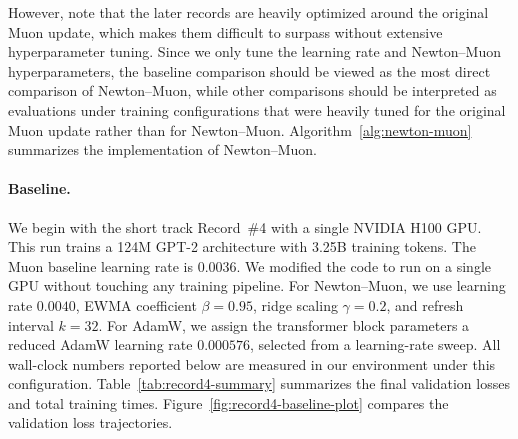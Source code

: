 \documentclass[11pt]{article}
\begin{document}
However, note that the later records are heavily optimized around the original Muon update, which makes them difficult to surpass without extensive hyperparameter tuning.
Since we only tune the learning rate and Newton--Muon hyperparameters, the baseline comparison should be viewed as the most direct comparison of Newton--Muon, while other comparisons should be interpreted as evaluations under training configurations that were heavily tuned for the original Muon update rather than for Newton--Muon.
Algorithm~\ref{alg:newton-muon} summarizes the implementation of Newton--Muon.

\begin{algorithm}[htb]
\caption{Newton--Muon}
\label{alg:newton-muon}
\DontPrintSemicolon


\BlankLine
{}
\end{algorithm}

\paragraph{Baseline.}
We begin with the short track Record~\#4 with a single NVIDIA H100 GPU. This run trains a 124M GPT-2 architecture with 3.25B training tokens. The Muon baseline
learning rate is $0.0036$. We modified the code to run on a single GPU without touching any training pipeline. For Newton--Muon, we use learning
rate $0.0040$, EWMA coefficient $\beta=0.95$, ridge scaling $\gamma=0.2$, and refresh interval $k=32$. For AdamW, we assign the transformer block parameters a reduced AdamW learning rate $0.000576$, selected from a learning-rate sweep. All wall-clock numbers reported below are measured in our environment under this configuration. 
Table~\ref{tab:record4-summary} summarizes the final validation losses and total training times. Figure~\ref{fig:record4-baseline-plot} compares the validation loss trajectories.
\end{document}
